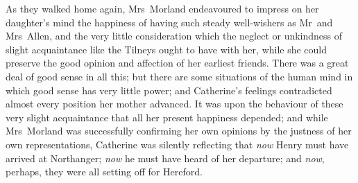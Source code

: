  As they walked home again, Mrs~Morland endeavoured to impress on her daughter's mind the happiness of having such steady well-wishers as Mr~and Mrs~Allen, and the very little consideration which the neglect or unkindness of slight acquaintance like the Tilneys ought to have with her, while she could preserve the good opinion and affection of her earliest friends. There was a great deal of good sense in all this; but there are some situations of the human mind in which good sense has very little power; and Catherine's feelings contradicted almost every position her mother advanced. It was upon the behaviour of these very slight acquaintance that all her present happiness depended; and while Mrs~Morland was successfully confirming her own opinions by the justness of her own representations, Catherine was silently reflecting that \textit{now} Henry must have arrived at Northanger; \textit{now} he must have heard of her departure; and \textit{now}, perhaps, they were all setting off for Hereford. 